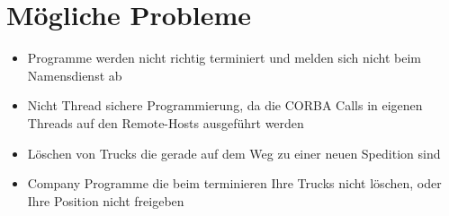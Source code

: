 \documentclass{article}
\begin{document}
\section{Mögliche Probleme}
\begin{itemize}
	\item Programme werden nicht richtig terminiert und melden sich nicht beim Namensdienst ab
	\item Nicht Thread sichere Programmierung, da die CORBA Calls in eigenen Threads auf den Remote-Hosts ausgeführt werden
	\item Löschen von Trucks die gerade auf dem Weg zu einer neuen Spedition sind
	\item Company Programme die beim terminieren Ihre Trucks nicht löschen, oder Ihre Position nicht freigeben
\end{itemize}
\end{document}
